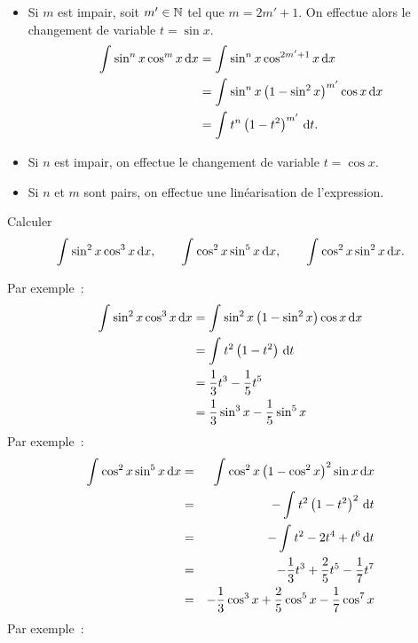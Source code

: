 \documentclass{magnoliaold}
\begin{document}
\begin{itemize}
  \begin{itemize}
  \item Si $m$ est impair, soit $m'\in\mathbb{N}$ tel que $m=2m'+1$. On effectue alors
    le changement de variable $t=\sin x$.
    \begin{equation*}
    \begin{split}
    \int_{}^{} \sin^n x\cos^m x\,\text{d}x&=\int_{}^{} \sin^n x \cos^{2m'+1} x\,\text{d}x\\
                              &=\int_{}^{} \sin^n x \left(1-\sin^2 x\right)^{m'}\cos x\,\text{d}x\\
                              &=\int_{}^{} t^n\left(1-t^2\right)^{m'}\,\text{d}t.
    \end{split}
    \end{equation*}
  \item Si $n$ est impair, on effectue le changement de variable $t=\cos x$.
  \item Si $n$ et $m$ sont pairs, on effectue une linéarisation de
    l'expression. 
  \end{itemize}
\begin{exoUnique}
\exo Calculer
  \[\int_{}^{} \sin^2 x\cos^3 x\,\text{d}x, \qquad \int_{}^{} \cos^2 x\sin^5 x\,\text{d}x, \qquad
    \int_{}^{} \cos^2 x\sin^2 x\,\text{d}x.\]
    \begin{sol}
  Par exemple~:
    \begin{equation*}
    \begin{split}
    \int_{}^{} \sin^2 x\cos^3 x\,\text{d}x&=\int_{}^{} \sin^2 x \left(1-\sin^2 x\right)\cos x\,\text{d}x\\
                              &=\int_{}^{} t^2\left(1-t^2\right)\,\text{d}t\\
                              &=\frac{1}{3}t^3-\frac{1}{5}t^5\\
                              &=\frac{1}{3}\sin^3 x-\frac{1}{5}\sin^5 x\\
    \end{split}
    \end{equation*}    
     Par exemple~:
    \begin{eqnarray*}
    \int_{}^{} \cos^2 x\sin^5 x\,\text{d}x&=&\int_{}^{} \cos^2 x\left(1-\cos^2 x\right)^2\sin x\,\text{d}x\\
      &=&-\int_{}^{} t^2\left(1-t^2\right)^2\,\text{d}t\\
      &=&-\int_{}^{} t^2-2t^4+t^6\,\text{d}t\\
      &=&-\frac{1}{3}t^3+\frac{2}{5}t^5-\frac{1}{7}t^7\\
      &=&-\frac{1}{3}\cos^3 x+\frac{2}{5}\cos^5 x-\frac{1}{7}\cos^7 x
    \end{eqnarray*}
Par exemple~:
    \begin{eqnarray*}

\end{eqnarray*}
\end{sol}
\end{exoUnique}
\end{itemize}
\end{document}
